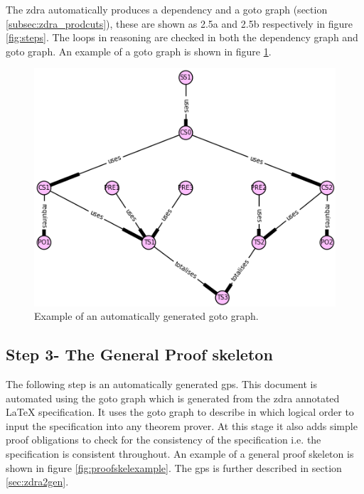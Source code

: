The \gls{zdra} automatically produces a dependency and a goto graph (section
\ref{subsec:zdra_prodcuts}), these are shown as 2.5a and 2.5b respectively in
figure \ref{fig:steps}. The loops in reasoning are checked in both the dependency
graph and goto graph. An example of a goto graph is shown in figure
\ref{fig:gotoexamplee}.

\begin{figure}[H]
 \begin{center}
 \includegraphics [scale=0.4]{Figures/Design/goto.png}
 \caption{Example of an automatically generated goto graph.}
 \label{fig:gotoexamplee}
\end{center}
\end{figure} 

\subsection{Step 3- The General Proof skeleton}

The following step is an automatically generated \gls{gps}. This document is
automated using the goto graph which is generated from the \gls{zdra} annotated
\LaTeX{} specification. It uses the goto graph to describe in which logical
order to input the specification into any theorem prover. At this stage it also
adds simple proof obligations to check for the consistency of the specification
i.e. the specification is consistent throughout. An example of a general proof
skeleton is shown in figure \ref{fig:proofskelexample}. The \gls{gps} is further
described in section \ref{sec:zdra2gen}.


